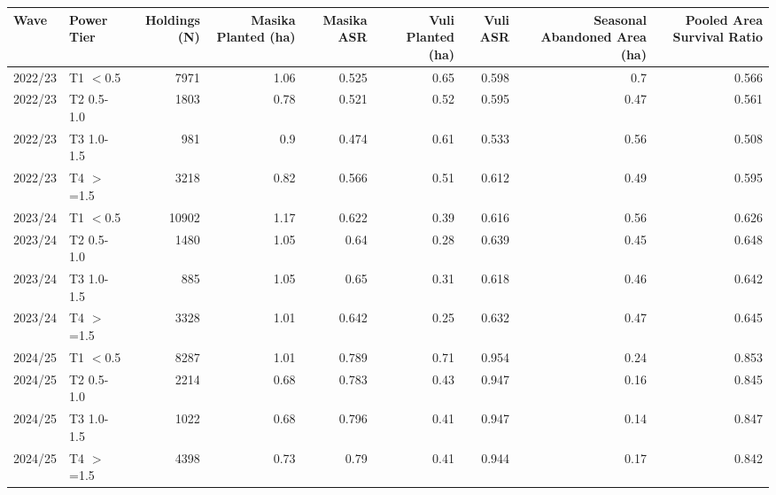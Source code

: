 \begin{tabular}{llrrrrrrr}
\toprule
 Wave    & Power Tier   &   Holdings (N) &   Masika Planted (ha) &   Masika ASR &   Vuli Planted (ha) &   Vuli ASR &   Seasonal Abandoned Area (ha) &   Pooled Area Survival Ratio \\
\midrule
 2022/23 & T1 \ensuremath{<}0.5      &           7971 &                  1.06 &        0.525 &                0.65 &      0.598 &                           0.7  &                        0.566 \\
 2022/23 & T2 0.5-1.0   &           1803 &                  0.78 &        0.521 &                0.52 &      0.595 &                           0.47 &                        0.561 \\
 2022/23 & T3 1.0-1.5   &            981 &                  0.9  &        0.474 &                0.61 &      0.533 &                           0.56 &                        0.508 \\
 2022/23 & T4 \ensuremath{>}=1.5     &           3218 &                  0.82 &        0.566 &                0.51 &      0.612 &                           0.49 &                        0.595 \\
 2023/24 & T1 \ensuremath{<}0.5      &          10902 &                  1.17 &        0.622 &                0.39 &      0.616 &                           0.56 &                        0.626 \\
 2023/24 & T2 0.5-1.0   &           1480 &                  1.05 &        0.64  &                0.28 &      0.639 &                           0.45 &                        0.648 \\
 2023/24 & T3 1.0-1.5   &            885 &                  1.05 &        0.65  &                0.31 &      0.618 &                           0.46 &                        0.642 \\
 2023/24 & T4 \ensuremath{>}=1.5     &           3328 &                  1.01 &        0.642 &                0.25 &      0.632 &                           0.47 &                        0.645 \\
 2024/25 & T1 \ensuremath{<}0.5      &           8287 &                  1.01 &        0.789 &                0.71 &      0.954 &                           0.24 &                        0.853 \\
 2024/25 & T2 0.5-1.0   &           2214 &                  0.68 &        0.783 &                0.43 &      0.947 &                           0.16 &                        0.845 \\
 2024/25 & T3 1.0-1.5   &           1022 &                  0.68 &        0.796 &                0.41 &      0.947 &                           0.14 &                        0.847 \\
 2024/25 & T4 \ensuremath{>}=1.5     &           4398 &                  0.73 &        0.79  &                0.41 &      0.944 &                           0.17 &                        0.842 \\
\bottomrule
\end{tabular}